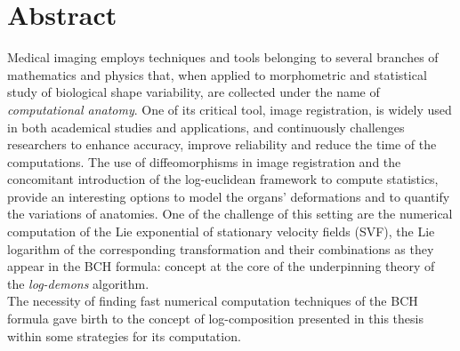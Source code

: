 
\qquad
\pagestyle{empty}
\newpage


\section*{Abstract}

Medical imaging employs techniques and tools belonging to several branches of mathematics and physics that, when applied to morphometric and statistical study of biological shape variability, are collected under the name of \emph{computational anatomy}. 
One of its critical tool, image registration, is widely used in both academical studies and applications, and continuously challenges researchers to enhance accuracy, improve reliability and reduce the time of the computations. The use of diffeomorphisms in image registration and the concomitant introduction of the log-euclidean framework to compute statistics, provide an interesting options to model the organs' deformations and to quantify the variations of anatomies.
One of the challenge of this setting are the numerical computation of the Lie exponential of stationary velocity fields (SVF), the Lie logarithm of the corresponding transformation and their combinations as they appear in the BCH formula: concept at the core of the underpinning theory of the \emph{log-demons} algorithm.\\
The necessity of finding fast numerical computation techniques of the BCH formula gave birth to the concept of log-composition presented in this thesis within some strategies for its computation.


